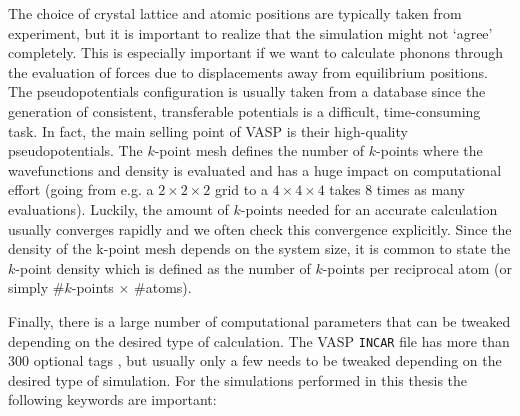 The choice of crystal lattice and atomic positions are typically taken from experiment, but it is important to realize that the simulation might not `agree' completely. This is especially important if we want to calculate phonons through the evaluation of forces due to displacements away from equilibrium positions. The pseudopotentials configuration is usually taken from a database since the generation of consistent, transferable potentials is a difficult, time-consuming task. In fact, the main selling point of VASP is their high-quality pseudopotentials. The $k$-point mesh defines the number of $k$-points where the wavefunctions and density is evaluated and has a huge impact on computational effort (going from e.g. a $2 \times 2 \times 2$ grid to a $4 \times 4 \times 4$ takes 8 times as many evaluations). Luckily, the amount of $k$-points needed for an accurate calculation usually converges rapidly and we often check this convergence explicitly. Since the density of the k-point mesh depends on the system size, it is common to state the $k$-point density which is defined as the number of $k$-points per reciprocal atom (or simply \#$k$-points $\times$ \#atoms).

Finally, there is a large number of computational parameters that can be tweaked depending on the desired type of calculation. The VASP \texttt{INCAR} file has more than 300 optional tags \cite{zotero-1437}, but usually only a few needs to be tweaked depending on the desired type of simulation. For the simulations performed in this thesis the following keywords are important:


